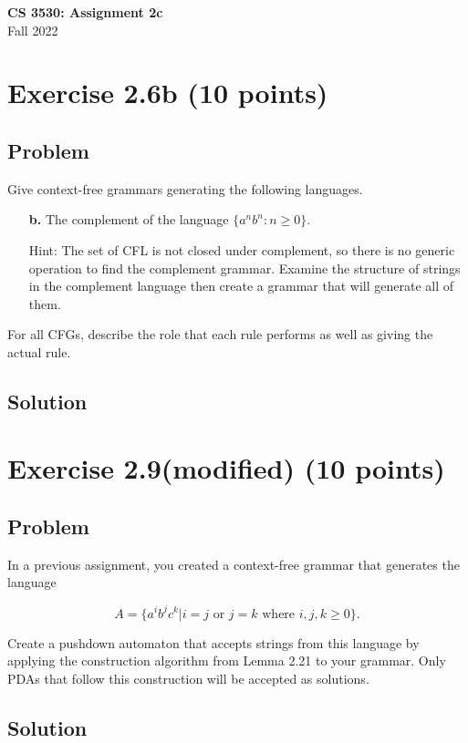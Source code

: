 \documentclass{article}
\begin{document}
\begin{empfile}

\begin{center}
\textbf{\Large CS 3530: Assignment 2c} \\[2mm]
Fall 2022
\end{center}

\raggedright


\section*{Exercise 2.6b (10 points)}

\subsection*{Problem}

Give context-free grammars generating the following languages.

\begin{enumerate}
\item[\textbf{b.}] The complement of the language $\{a^n b^n:n\geq 0\}$.

  Hint: The set of CFL
  is not closed under complement, so there is no generic operation to find the complement grammar.
  Examine the structure of strings in the complement language then create a grammar that will
  generate all of them.
\end{enumerate}

For all CFGs, describe the role that each rule performs as well as
giving the actual rule.

\subsection*{Solution}


\section*{Exercise 2.9(modified) (10 points)}

\subsection*{Problem}

In a previous assignment, you created a context-free grammar
that generates the language

$$
A=\{a^ib^jc^k|i=j\text{ or }j=k\text{ where }i,j,k\geq 0\}.
$$

Create a pushdown automaton that accepts strings from this
language by applying the construction algorithm from
Lemma 2.21 to your grammar. Only PDAs that follow this
construction will be accepted as solutions.

\subsection*{Solution}

\end{empfile}
\immediate{}
\end{document}
